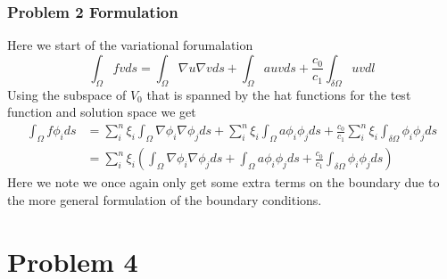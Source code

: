 \documentclass[11pt]{article}
\begin{document}
\subsubsection{Problem 2 Formulation}
Here we start of the variational forumalation
\begin{equation}
	\int_{\Omega} f v ds = \int_{\Omega} \nabla u \nabla v ds + \int_{\Omega} a u v ds + \frac{c_0}{c_1}\int_{\delta \Omega} u v dl 
\end{equation} 
Using the subspace of $V_0$ that is spanned by the hat functions for the test function and solution space we get
\begin{align}
	\int_{\Omega} f \phi_i ds &= \sum^n_i \xi_i \int_{\Omega} \nabla \phi_i \nabla \phi_j ds + \sum^n_i \xi_i \int_{\Omega} a \phi_i \phi_j  ds + \frac{c_0}{c_1} \sum^n_i \xi_i \int_{\delta \Omega} \phi_i \phi_j ds \\
	&= \sum^n_i \xi_i ( \int_{\Omega} \nabla \phi_i \nabla \phi_j ds + \int_{\Omega} a \phi_i \phi_j  ds + \frac{c_0}{c_1} \int_{\delta \Omega} \phi_i \phi_j ds )
\end{align}
Here we note we once again only get some extra terms on the boundary due to the more general formulation of the boundary conditions. 

\section{Problem 4}
\end{document}

